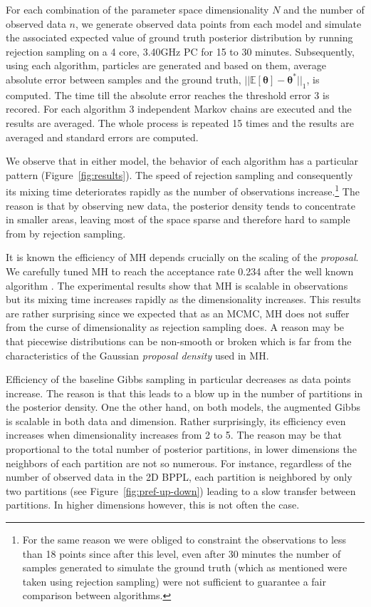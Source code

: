 For each combination of the parameter space dimensionality $N$ and the number of observed data $n$, we generate observed data points from each model and simulate the associated expected value of ground truth posterior distribution by running rejection sampling on a 4 core, 3.40GHz PC for 15 to 30 minutes.
Subsequently, using each algorithm, particles are generated and based on them, 
average absolute error between samples and the ground truth, $||\mathbb{E}[\boldsymbol\theta] - \boldsymbol\theta^*||_1$, is computed. 
The time till the absolute error reaches the threshold error 3 is recored.
For each algorithm 3 independent Markov chains are executed and the results are averaged.
The whole process is repeated 15 times and the results are averaged and standard errors are computed. 

We observe that %
in either model, the behavior of each algorithm has a particular pattern (Figure~\ref{fig:results}). 
The speed of rejection sampling and consequently its mixing time deteriorates rapidly as the number of observations increase.\footnote{For the same reason we were obliged to constraint the observations to less than 18 points since after this level, even after 30 minutes the number of samples generated to simulate the ground truth (which as mentioned were taken using rejection sampling) were not sufficient to guarantee a fair comparison between algorithms.}
The reason is that by observing new data, the posterior density tends to concentrate in smaller areas, 
leaving most of the space sparse and therefore hard to sample from by rejection sampling.

It is known the efficiency of MH depends crucially on the scaling of the \emph{proposal}.
We carefully tuned MH to reach the acceptance rate 0.234 after the well known algorithm \cite{Roberts:97}. 
The experimental results show that MH is scalable in observations but its mixing time increases rapidly as the dimensionality increases. 
This results are rather surprising since we expected that as an MCMC, MH does not suffer from the curse of dimensionality as rejection sampling does. 
A reason may be that piecewise distributions can be non-smooth or broken which is far from the characteristics of the Gaussian \emph{proposal density} used in MH. 

Efficiency of the baseline Gibbs sampling in particular decreases as data points increase.
The reason is that this leads to a blow up in the number of partitions in the posterior density.
One the other hand, on both models, the augmented Gibbs is scalable in both data and dimension. 
Rather surprisingly, its efficiency even increases when dimensionality increases from 2 to 5.
The reason may be that proportional to the total number of posterior partitions, in lower dimensions the neighbors of each partition are not so numerous. 
For instance, regardless of the number of observed data in the 2D BPPL, each partition is neighbored by only two partitions (see Figure~\ref{fig:pref-up-down}) leading to a slow transfer between partitions. 
In higher dimensions however, this is not often the case.

